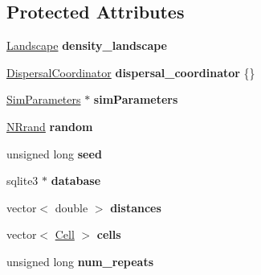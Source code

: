 \subsection*{Protected Attributes}
\begin{DoxyCompactItemize}
\item 
\hyperlink{class_landscape}{Landscape} {\bfseries density\+\_\+landscape}\hypertarget{class_simulate_dispersal_a3538ef66eedcee56817aabb26a1d9d27}{}\label{class_simulate_dispersal_a3538ef66eedcee56817aabb26a1d9d27}

\item 
\hyperlink{class_dispersal_coordinator}{Dispersal\+Coordinator} {\bfseries dispersal\+\_\+coordinator} \{\}\hypertarget{class_simulate_dispersal_a55da369d57d854168ff6e851b0d7892a}{}\label{class_simulate_dispersal_a55da369d57d854168ff6e851b0d7892a}

\item 
\hyperlink{struct_sim_parameters}{Sim\+Parameters} $\ast$ {\bfseries sim\+Parameters}\hypertarget{class_simulate_dispersal_a6d11b4ed3e3942d2bb42e66116fffd2d}{}\label{class_simulate_dispersal_a6d11b4ed3e3942d2bb42e66116fffd2d}

\item 
\hyperlink{class_n_rrand}{N\+Rrand} {\bfseries random}\hypertarget{class_simulate_dispersal_a5f6389fc4116b52622a900c55532f86b}{}\label{class_simulate_dispersal_a5f6389fc4116b52622a900c55532f86b}

\item 
unsigned long {\bfseries seed}\hypertarget{class_simulate_dispersal_af9ab2fa8b2c3e1bb1ba49b31679ae0d7}{}\label{class_simulate_dispersal_af9ab2fa8b2c3e1bb1ba49b31679ae0d7}

\item 
sqlite3 $\ast$ {\bfseries database}\hypertarget{class_simulate_dispersal_afd3f96f169715aacbcc2939614a6a910}{}\label{class_simulate_dispersal_afd3f96f169715aacbcc2939614a6a910}

\item 
vector$<$ double $>$ {\bfseries distances}\hypertarget{class_simulate_dispersal_a616354e9527a71396a428bb63f444a15}{}\label{class_simulate_dispersal_a616354e9527a71396a428bb63f444a15}

\item 
vector$<$ \hyperlink{struct_cell}{Cell} $>$ {\bfseries cells}\hypertarget{class_simulate_dispersal_abcb3ce61b835cbd007d09726302d692a}{}\label{class_simulate_dispersal_abcb3ce61b835cbd007d09726302d692a}

\item 
unsigned long {\bfseries num\+\_\+repeats}\hypertarget{class_simulate_dispersal_a36ca3df92a79e284cdeb84ea0dfb3c9a}{}\label{class_simulate_dispersal_a36ca3df92a79e284cdeb84ea0dfb3c9a}


\end{DoxyCompactItemize}
